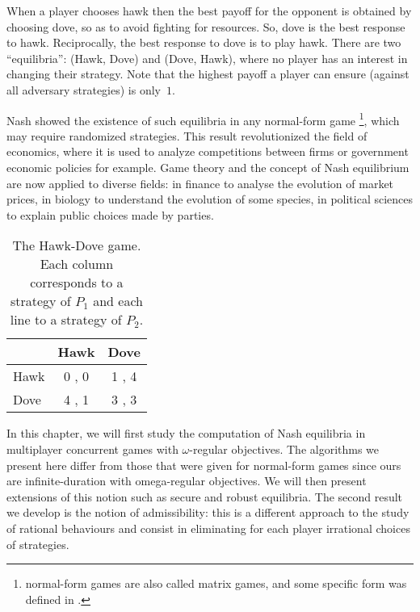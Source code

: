 When a player chooses hawk then the best payoff for the opponent is
obtained by choosing dove, so as to avoid fighting for resources.
So, dove is the best response to hawk. Reciprocally, the best response to
dove is to play hawk. There are two ``equilibria'': (Hawk, Dove) and
(Dove, Hawk), where no player has an interest in changing their
strategy. Note that the highest payoff a player can ensure
(against all adversary strategies) is only~$1$.

Nash showed the existence of such equilibria in any normal-form game
\footnote{normal-form games are also called matrix games, and some
specific form was defined in .},
which may require randomized strategies. This result
revolutionized the field of economics, where it is used to analyze
competitions between firms or government economic policies for example.
Game theory and the concept of Nash equilibrium are now applied to
diverse fields: in finance to analyse the evolution of market prices, in
biology to understand the evolution of some species, in political
sciences to explain public choices made by parties.

\begin{table}
  \caption{The Hawk-Dove game. Each column corresponds to a strategy of
    \(P_1\) and each line to a strategy of \(P_2\).}
  \label{13-tab:hawk-dove}
  \begin{center}
    \begin{tabular}[c]{|@{~}l@{~}|@{~}c@{~} @{~}c@{~}|}
      \hline
      & Hawk & Dove \\
      \hline
      Hawk & 0 , 0 & 1 , 4 \\
      Dove & 4 , 1 & 3 , 3 \\
      \hline
    \end{tabular}
  \end{center}
\end{table}

\medskip
In this chapter, we will first study the computation of Nash
equilibria in multiplayer concurrent games with $\omega$-regular
objectives. The algorithms we present here differ from those that were
given for normal-form games since ours are infinite-duration with
omega-regular objectives. We will then present extensions of this notion
such as secure and
robust equilibria. The second result we develop is
the notion of admissibility: this is a different approach to the study
of rational behaviours and consist in eliminating for each player
irrational choices of strategies.

